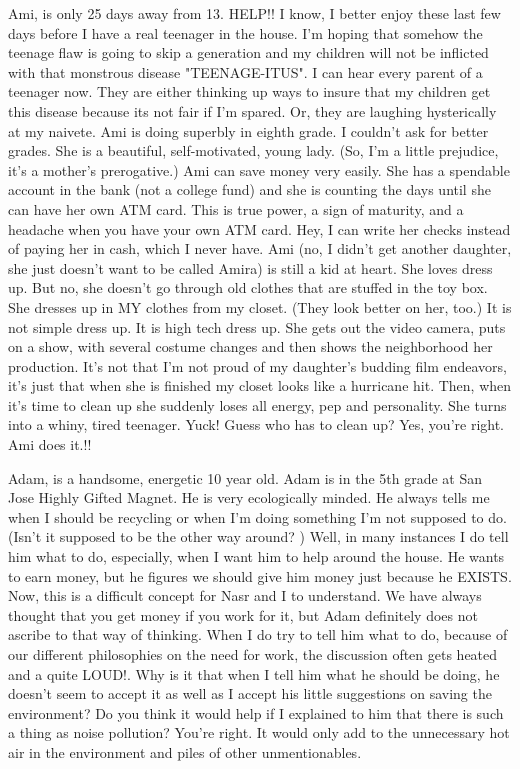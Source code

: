 Ami, is only 25 days away from 13. HELP!! I know, I better enjoy these last few days before I have a real teenager in the house. I'm hoping that
somehow the teenage flaw is going to skip a generation and my children will not be inflicted with that monstrous disease "TEENAGE-ITUS". I can
hear every parent of a teenager now. They are either thinking up ways to insure that my children get this disease because its not fair if I'm
spared. Or, they are laughing hysterically at my naivete. Ami is doing superbly in eighth grade. I couldn't ask for better grades. She is a
beautiful, self-motivated, young lady. (So, I'm a little prejudice, it's a mother's prerogative.) Ami can save money very easily. She has a
spendable account in the bank (not a college fund) and she is counting the days until she can have her own ATM card. This is true power, a sign
of maturity, and a headache when you have your own ATM card. Hey, I can write her checks instead of paying her in cash, which I never have. Ami
(no, I didn't get another daughter, she just doesn't want to be called Amira) is still a kid at heart. She loves dress up. But no, she doesn't
go through old clothes that are stuffed in the toy box. She dresses up in MY clothes from my closet. (They look better on her, too.) It is not
simple dress up. It is high tech dress up. She gets out the video camera, puts on a show, with several costume changes and then shows the
neighborhood her production. It's not that I'm not proud of my daughter's budding film endeavors, it's just that when she is finished my closet
looks like a hurricane hit. Then, when it's time to clean up she suddenly loses all energy, pep and personality. She turns into a whiny, tired
teenager. Yuck! Guess who has to clean up? Yes, you're right. Ami does it.!!

Adam, is a handsome, energetic 10 year old. Adam is in the 5th grade at San Jose Highly Gifted Magnet. He is very ecologically minded. He always
tells me when I should be recycling or when I'm doing something I'm not supposed to do. (Isn't it supposed to be the other way around? ) Well,
in many instances I do tell him what to do, especially, when I want him to help around the house. He wants to earn money, but he figures we
should give him money just because he EXISTS. Now, this is a difficult concept for Nasr and I to understand. We have always thought that you get
money if you work for it, but Adam definitely does not ascribe to that way of thinking. When I do try to tell him what to do, because of our
different philosophies on the need for work, the discussion often gets heated and a quite LOUD!. Why is it that when I tell him what he should
be doing, he doesn't seem to accept it as well as I accept his little suggestions on saving the environment? Do you think it would help if I
explained to him that there is such a thing as noise pollution? You're right. It would only add to the unnecessary hot air in the environment
and piles of other unmentionables.

